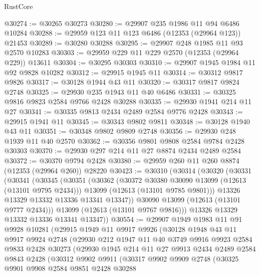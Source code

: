 \begin{lexlean}{RustCore}
\begin{coremodule}
@30274 := @30265 @30273
@30280 := @29907 @235 @1986 @11 @94 @6486 @10284
@30288 := @29959 @123 @11 @123 @6486 (@12353 (@29964 @123)) @21453
@30289 := @30280 @30288
@30295 := @29907 @248 @1985 @11 @93 @2570 @10283
@30303 := @29959 @229 @11 @229 @2570 (@12353 (@29964 @229)) @13611
@30304 := @30295 @30303
@30310 := @29907 @1945 @1984 @11 @92 @9828 @10282
@30312 := @29915 @1945 @11
@30314 := @30312 @9817 @9826
@30317 := @30128 @1944 @43 @11
@30320 := @30317 @9817 @9824 @2748
@30325 := @29930 @235 @1943 @11 @40 @6486
@30331 := @30325 @9816 @9823 @2584 @9766 @2428 @30288
@30335 := @29930 @1941 @214 @11 @27
@30341 := @30335 @9813 @2434 @2489 @2584 @9776 @2428
@30343 := @29915 @1941 @11
@30345 := @30343 @9802 @9811
@30348 := @30128 @1940 @43 @11
@30351 := @30348 @9802 @9809 @2748
@30356 := @29930 @248 @1939 @11 @40 @2570
@30362 := @30356 @9801 @9808 @2584 @9784 @2428 @30303
@30370 := @29930 @297 @214 @11 @27 @8874 @2434 @2489 @2584
@30372 := @30370 @9794 @2428
@30380 := @29959 @260 @11 @260 @8874 (@12353 (@29964 @260)) @28220
@30423 := @30310
    (@30314
      (@30320
        (@30331
          (@30341
            (@30345
              (@30351
                (@30362
                  (@30372 @30380 @30090 @13099 (@12613 (@13101 @9795 @2434)))
                  @13099
                  (@12613 (@13101 @9785 @9801)))
                @13326
                @13329
                @13332
                @13336
                @13341
                @13347))
            @30090
            @13099
            (@12613 (@13101 @9777 @2434)))
          @13099
          (@12613 (@13101 @9767 @9816)))
        @13326
        @13329
        @13332
        @13336
        @13341
        @13347))
@30554 := @29907
    @1949
    @1983
    @11
    @91
    @9928
    @10281
    (@29915
      @1949
      @11
      @9917
      @9926
      (@30128
        @1948
        @43
        @11
        @9917
        @9924
        @2748
        (@29930
          @212
          @1947
          @11
          @40
          @3749
          @9916
          @9923
          @2584
          @9833
          @2428
          @30273
          (@29930
            @1945
            @214
            @11
            @27
            @9913
            @2434
            @2489
            @2584
            @9843
            @2428
            (@30312
              @9902
              @9911
              (@30317
                @9902
                @9909
                @2748
                (@30325
                  @9901
                  @9908
                  @2584
                  @9851
                  @2428
                  @30288

\end{coremodule}
\end{lexlean}
